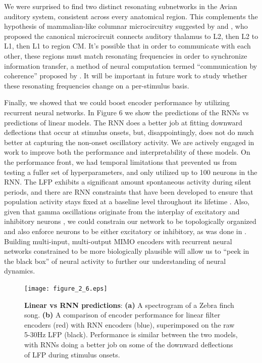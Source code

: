 We were surprised to find two distinct resonating subnetworks in the Avian auditory system, consistent across every anatomical region. This complements the hypothesis of mammalian-like columnar microcircuitry suggested by \cite{Wang2010} and \cite{Calabrese2015}, who proposed the canonical microcircuit connects auditory thalamus to L2, then L2 to L1, then L1 to region CM. It’s possible that in order to communicate with each other, these regions must match resonating frequencies in order to synchronize information transfer, a method of neural computation termed “communication by coherence” proposed by \cite{Fries2005}. It will be important in future work to study whether these resonating frequencies change on a per-stimulus basis.

Finally, we showed that we could boost encoder performance by utilizing recurrent neural networks. In Figure 6 we show the predictions of the RNNs vs predictions of linear models. The RNN does a better job at fitting downward deflections that occur at stimulus onsets, but, disappointingly, does not do much better at capturing the non-onset oscillatory activity. We are actively engaged in work to improve both the performance and interpretability of these models. On the performance front, we had temporal limitations that prevented us from testing a fuller set of hyperparameters, and only utilized up to 100 neurons in the RNN. The LFP exhibits a significant amount spontaneous activity during silent periods, and there are RNN constraints that have been developed to ensure that population activity stays fixed at a baseline level throughout its lifetime \cite{Krueger2015}. Also, given that gamma oscillations originate from the interplay of excitatory and inhibitory neurons \cite{Buzsaki2012a}, we could constrain our network to be topologically organized and also enforce neurons to be either excitatory or inhibitory, as was done in \cite{Song2016}. Building multi-input, multi-output MIMO encoders with recurrent neural networks constrained to be more biologically plausible will allow us to ``peek in the black box'' of neural activity to further our understanding of neural dynamics.


\begin{figure}
    \caption{\textbf{Linear vs RNN predictions}: \textbf{(a)} A spectrogram of a Zebra finch song. \textbf{(b)} A comparison of encoder performance for linear filter encoders (red) with RNN encoders (blue), superimposed on the raw 5-30Hz LFP (black). Performance is similar between the two models, with RNNs doing a better job on some of the downward deflections of LFP during stimulus onsets.
}
    \centering
    \texttt{[image: figure\_2\_6.eps]}
\end{figure}


